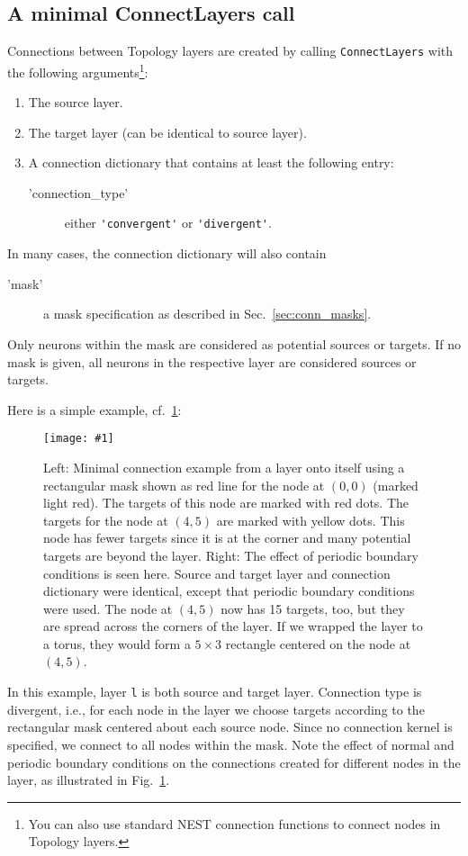\documentclass[a4paper,12pt]{report}
\newcommand{\scriptfig}[4]{%
\begin{figure}
\centerline{\texttt{[image: \#1]}}
\caption[#3]{#4}
\label{fig:#1}
\end{figure}%
}
\begin{document}
\subsection{A minimal ConnectLayers call}\label{sec:minimalcall}
Connections between Topology layers are created by calling
\lstinline!ConnectLayers! with the following arguments\footnote{You
  can also use standard NEST connection functions to connect nodes in
  Topology layers.}:
\begin{enumerate}
\item The source layer.
\item The target layer (can be identical to source layer).
\item A connection dictionary that contains at least the following entry:
\begin{description}
\item['connection\_type'] either \lstinline!'convergent'!
  or \lstinline!'divergent'!.
\end{description}
\end{enumerate}
In many cases, the connection dictionary will also contain
\begin{description}
\item['mask'] a mask specification as described in
  Sec.~\ref{sec:conn_masks}.
\end{description}
Only neurons within the mask are considered as potential sources or
targets. If no mask is given, all neurons in the respective layer
are considered sources or targets.

Here is a simple example, cf.~\ref{fig:conn1}:
%

\scriptfig{conn1}{0.9}{Minimal connection example}%
{Left: Minimal connection example from a layer onto itself using a
  rectangular mask shown as red line for the node at $(0,0)$ (marked
  light red). The targets of this node are marked with red dots. The targets
  for the node at $(4,5)$ are marked with yellow
  dots. This node has fewer targets since it is at the corner and many
  potential targets are beyond the layer.
Right: The effect of periodic boundary conditions\index{periodic
  boundary cond.} is seen here. Source and target layer and connection dictionary
were identical, except that periodic boundary conditions were
used. The node at $(4,5)$ now has 15 targets, too, but they are spread
across the corners of the layer. If we wrapped the layer to a torus,
they would form a $5\times 3$ rectangle centered on the node at $(4,5)$.}
%
In this example, layer \lstinline!l! is both source and target
layer. Connection type is divergent, i.e., for each node in the layer
we choose targets according to the rectangular mask centered about
each source node. Since no connection kernel is specified, we connect
to all nodes within the mask. Note the effect of normal and periodic
boundary conditions on the connections created for different nodes in
the layer, as illustrated in Fig.~\ref{fig:conn1}.
\end{document}
